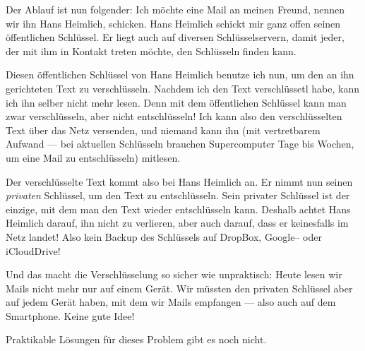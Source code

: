 {  Der Ablauf ist nun folgender: Ich möchte eine Mail an meinen Freund, nennen wir ihn Hans Heimlich, schicken. Hans Heimlich schickt mir ganz offen seinen öffentlichen Schlüssel. Er liegt auch auf diversen Schlüsselservern, damit jeder, der mit ihm in Kontakt treten möchte, den Schlüsseln finden kann.

  Diesen öffentlichen Schlüssel von Hans Heimlich benutze ich nun, um den an ihn gerichteten Text zu verschlüsseln. Nachdem ich den Text verschlüssetl habe, kann ich ihn selber nicht mehr lesen. Denn mit dem öffentlichen Schlüssel kann man zwar verschlüsseln, aber nicht entschlüsseln! Ich kann also den verschlüsselten Text über das Netz versenden, und niemand kann ihn (mit vertretbarem Aufwand --- bei aktuellen Schlüsseln brauchen Supercomputer Tage bis Wochen, um eine Mail zu entschlüsseln) mitlesen.

  Der verschlüsselte Text kommt also bei Hans Heimlich an. Er nimmt nun seinen \emph{privaten} Schlüssel, um den Text zu entschlüsseln. Sein privater Schlüssel ist der einzige, mit dem man den Text wieder entschlüsseln kann. Deshalb achtet Hans Heimlich darauf, ihn nicht zu verlieren, aber auch darauf, dass er keinesfalls im Netz landet! Also kein Backup des Schlüssels auf DropBox, Google-- oder iCloudDrive!

  Und das macht die Verschlüsselung so sicher wie unpraktisch: Heute lesen wir Mails nicht mehr nur auf einem Gerät. Wir müssten den privaten Schlüssel aber auf jedem Gerät haben, mit dem wir Mails empfangen --- also auch auf dem Smartphone. Keine gute Idee! 

  Praktikable Lösungen für dieses Problem gibt es noch nicht. 
}
